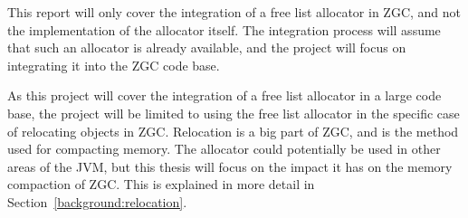 This report will only cover the integration of a free list allocator in ZGC, and not the implementation of the allocator itself. The integration process will assume that such an allocator is already available, and the project will focus on integrating it into the ZGC code base.

As this project will cover the integration of a free list allocator in a large code base, the project will be limited to using the free list allocator in the specific case of relocating objects in ZGC. Relocation is a big part of ZGC, and is the method used for compacting memory. The allocator could potentially be used in other areas of the JVM, but this thesis will focus on the impact it has on the memory compaction of ZGC. This is explained in more detail in Section~\ref{background:relocation}. 